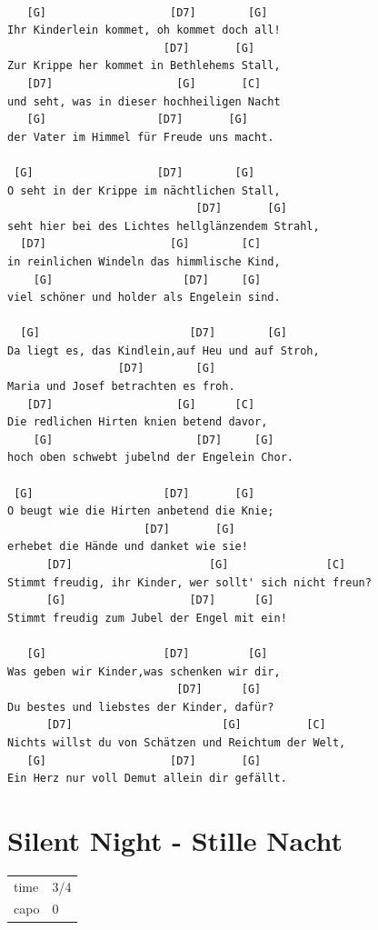 \documentclass[
]{book}
\let\stdsection\section
\renewcommand\section{\clearpage\stdsection}
\begin{document}
\begin{verbatim}

   [G]                   [D7]        [G]    
Ihr Kinderlein kommet, oh kommet doch all!
                        [D7]       [G]    
Zur Krippe her kommet in Bethlehems Stall,
   [D7]                   [G]       [C] 
und seht, was in dieser hochheiligen Nacht
   [G]                 [D7]       [G]  
der Vater im Himmel für Freude uns macht.

 [G]                   [D7]        [G]  
O seht in der Krippe im nächtlichen Stall,
                             [D7]       [G]    
seht hier bei des Lichtes hellglänzendem Strahl,
  [D7]                   [G]        [C]      
in reinlichen Windeln das himmlische Kind,
    [G]                    [D7]     [G] 
viel schöner und holder als Engelein sind.

  [G]                       [D7]        [G]   
Da liegt es, das Kindlein,auf Heu und auf Stroh,
                 [D7]        [G]    
Maria und Josef betrachten es froh.
   [D7]                   [G]      [C]     
Die redlichen Hirten knien betend davor,
    [G]                      [D7]     [G]    
hoch oben schwebt jubelnd der Engelein Chor.

 [G]                    [D7]       [G]   
O beugt wie die Hirten anbetend die Knie;
                     [D7]       [G]    
erhebet die Hände und danket wie sie!
      [D7]                     [G]               [C]     
Stimmt freudig, ihr Kinder, wer sollt' sich nicht freun?
      [G]                   [D7]      [G]        
Stimmt freudig zum Jubel der Engel mit ein!

   [G]                  [D7]         [G]   
Was geben wir Kinder,was schenken wir dir,
                          [D7]      [G]    
Du bestes und liebstes der Kinder, dafür?
      [D7]                       [G]          [C]        
Nichts willst du von Schätzen und Reichtum der Welt,
   [G]                   [D7]       [G]        
Ein Herz nur voll Demut allein dir gefällt.
\end{verbatim}

\hypertarget{silent-night---stille-nacht}{%
\section{Silent Night - Stille Nacht}\label{silent-night---stille-nacht}}

\begin{longtable}[]{@{}ll@{}}
\toprule
\endhead
time & 3/4\tabularnewline
capo & 0\tabularnewline
\bottomrule
\end{longtable}
\end{document}
